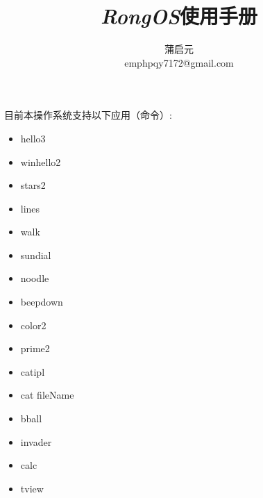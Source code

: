 \documentclass{wx672article} %
\title{\emph{RongOS}使用手册}
\author{蒲启元 \\
emph{pqy7172@gmail.com}}
\begin{document}
\maketitle{}
目前本操作系统支持以下应用（命令）:
\begin{itemize}
\item hello3
\item winhello2
\item stars2
\item lines
\item walk
\item sundial
\item noodle
\item beepdown
\item color2
\item prime2
\item catipl
\item cat fileName
\item bball
\item invader
\item calc
\item tview
  
\end{itemize}
\end{document}
